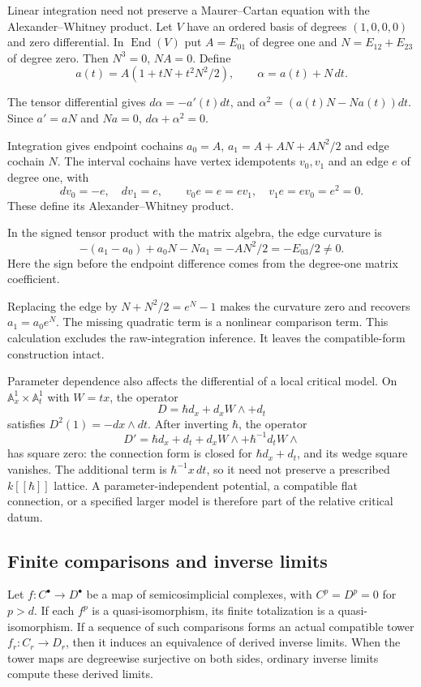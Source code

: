 \begin{example}\label{cycmp:ex:nonlinear-integration}
Linear integration need not preserve a Maurer--Cartan equation with
the Alexander--Whitney product. Let $V$ have an ordered basis of
degrees $(1,0,0,0)$ and zero differential. In $\operatorname{End}(V)$
put $A=E_{01}$ of degree one and $N=E_{12}+E_{23}$ of degree zero.
Then $N^3=0$, $NA=0$. Define
\[
 a(t)=A(1+tN+t^2N^2/2),\qquad
 \alpha=a(t)+N\,dt.
\]

The tensor differential gives $d\alpha=-a'(t)dt$, and
$\alpha^2=(a(t)N-Na(t))dt$. Since $a'=aN$ and $Na=0$,
$d\alpha+\alpha^2=0$.

Integration gives endpoint cochains
$a_0=A$, $a_1=A+AN+AN^2/2$ and edge cochain $N$.
The interval cochains have vertex idempotents $v_0,v_1$ and an
edge $e$ of degree one, with
\[
 dv_0=-e,\quad dv_1=e,\qquad v_0e=e=ev_1,
 \quad v_1e=ev_0=e^2=0.
\]
These define its Alexander--Whitney product.

In the signed tensor
product with the matrix algebra, the edge curvature is
\[
 -(a_1-a_0)+a_0N-Na_1=-AN^2/2=-E_{03}/2\ne0.
\]
Here the sign before the endpoint difference comes from the
degree-one matrix coefficient.

Replacing the edge by
$N+N^2/2=e^N-1$ makes the curvature zero and recovers
$a_1=a_0e^N$. The missing quadratic term is a nonlinear comparison
term. This calculation excludes the raw-integration inference.
It leaves the compatible-form construction intact.
\end{example}

Parameter dependence also affects the differential of a local
critical model. On $\mathbb A_x^1\times\mathbb A_t^1$ with
$W=tx$, the operator
\[
 D=\hbar d_x+d_xW\wedge+d_t
\]
satisfies $D^2(1)=-dx\wedge dt$. After inverting $\hbar$, the
operator
\[
 D'=\hbar d_x+d_t+d_xW\wedge
                      +\hbar^{-1}d_tW\wedge
\]
has square zero: the connection form is closed for
$\hbar d_x+d_t$, and its wedge square vanishes. The additional
term is $\hbar^{-1}x\,dt$, so it need not preserve a prescribed
$k[[\hbar]]$ lattice. A parameter-independent potential, a compatible
flat connection, or a specified larger model is therefore part of
the relative critical datum.

\subsection{Finite comparisons and inverse limits}

\begin{proposition}\label{cycmp:prop:finite-descent}
Let $f:C^\bullet\to D^\bullet$ be a map of semicosimplicial
complexes, with $C^p=D^p=0$ for $p>d$.
If each $f^p$ is a quasi-isomorphism, its finite totalization is a
quasi-isomorphism. If a sequence of such comparisons forms an
actual compatible tower $f_r:C_r\to D_r$, then it induces an
equivalence of derived inverse limits. When the tower maps are
degreewise surjective on both sides, ordinary inverse limits
compute these derived limits.
\end{proposition}

